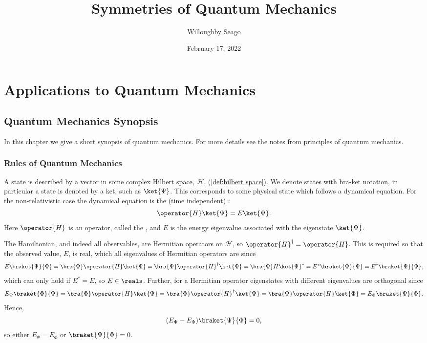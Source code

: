 \documentclass[fleqn]{NotesClass}
\title{Symmetries of Quantum Mechanics}
\author{Willoughby Seago}
\date{February 17, 2022}
\newcommand*{\hermit}{\dagger}
\newcommand*{\hilbert}{\mathcal{H}}
\begin{document}
    \frontmatter
    \titlepage
    \tableofcontents
    \listoffigures
    \mainmatter
    
    
    
    
    \part{Applications to Quantum Mechanics}
    \chapter{Quantum Mechanics Synopsis}
    In this chapter we give a short synopsis of quantum mechanics.
    For more details see the notes from principles of quantum mechanics.
    
    \section{Rules of Quantum Mechanics}
    A state is described by a vector in some complex Hilbert space, \(\hilbert\), (\cref{def:hilbert space}).
    We denote states with bra-ket notation, in particular a state is denoted by a ket, such as \(\ket{\Psi}\).
    This corresponds to some physical state which follows a dynamical equation.
    For the non-relativistic case the dynamical equation is the (time independent) :
    \begin{equation}
        \operator{H}\ket{\Psi} = E\ket{\Psi}.
    \end{equation}
    Here \(\operator{H}\) is an operator, called the , and \(E\) is the energy eigenvalue associated with the eigenstate \(\ket{\Psi}\).
    
    The Hamiltonian, and indeed all observables, are Hermitian operators on \(\hilbert\), so \(\operator{H}^\hermit = \operator{H}\).
    This is required so that the observed value, \(E\), is real, which all eigenvalues of Hermitian operators are since
    \begin{equation}
        E\braket{\Psi}{\Psi} = \bra{\Psi}\operator{H}\ket{\Psi} = \bra{\Psi}\operator{H}^\hermit\ket{\Psi} = \bra{\Psi}H\ket{\Psi}^* = E^*\braket{\Psi}{\Psi} = E^*\braket{\Psi}{\Psi},
    \end{equation}
    which can only hold if \(E^* = E\), so \(E \in \reals\).
    Further, for a Hermitian operator eigenstates with different eigenvalues are orthogonal since
    \begin{equation}
        E_{\Psi}\braket{\Phi}{\Psi} = \bra{\Phi}\operator{H}\ket{\Psi} = \bra{\Phi}\operator{H}^\hermit\ket{\Psi} = \bra{\Psi}\operator{H}\ket{\Phi} = E_{\Phi}\braket{\Psi}{\Phi}.
    \end{equation}
    Hence,
    \begin{equation}
        (E_{\Psi} - E_{\Phi})\braket{\Psi}{\Phi} = 0,
    \end{equation}
    so either \(E_{\Psi} = E_{\Phi}\) or \(\braket{\Psi}{\Phi} = 0\).
    
\end{document}
